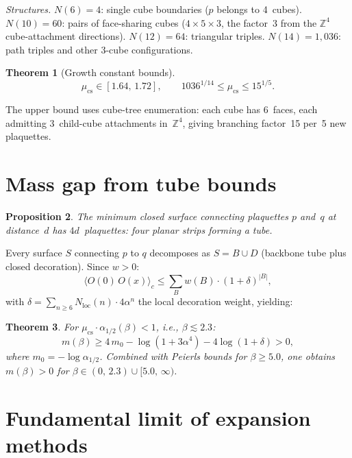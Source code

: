 \documentclass[12pt,a4paper]{article}
\newtheorem{theorem}{Theorem}[section]
\newtheorem{proposition}[theorem]{Proposition}
\newcommand{\Z}{\mathbb{Z}}
\begin{document}
\emph{Structures.} $N(6)=4$: single cube boundaries ($p$ belongs to 4~cubes). $N(10)=60$: pairs of face-sharing cubes ($4\times 5\times 3$, the factor~3 from the $\Z^4$ cube-attachment directions). $N(12)=64$: triangular triples. $N(14)=1{,}036$: path triples and other 3-cube configurations.

\begin{theorem}[Growth constant bounds]\label{thm:growth}
\begin{equation}
\mu_{\mathrm{cs}}\in[1.64,\,1.72], \qquad 1036^{1/14}\le \mu_{\mathrm{cs}}\le 15^{1/5}.
\end{equation}
\end{theorem}

The upper bound uses cube-tree enumeration: each cube has 6~faces, each admitting 3~child-cube attachments in~$\Z^4$, giving branching factor~15 per~5 new plaquettes.

\section{Mass gap from tube bounds}\label{sec:tube}

\begin{proposition}\label{prop:tube}
The minimum closed surface connecting plaquettes $p$ and~$q$ at distance~$d$ has $4d$~plaquettes: four planar strips forming a tube.
\end{proposition}

Every surface $S$ connecting $p$ to $q$ decomposes as $S=B\cup D$ (backbone tube plus closed decoration). Since $w>0$:
\begin{equation}
\langle O(0)\,O(x)\rangle_c \le \sum_B w(B)\cdot(1{+}\delta)^{|B|},
\end{equation}
with $\delta=\sum_{n\ge 6}N_{\mathrm{loc}}(n)\cdot 4\alpha^n$ the local decoration weight, yielding:

\begin{theorem}\label{thm:mass}
For $\mu_{\mathrm{cs}}\cdot\alpha_{1/2}(\beta)<1$, i.e., $\beta\lesssim 2.3$:
\begin{equation}
m(\beta) \ge 4\,m_0 - \log(1{+}3\alpha^4) - 4\log(1{+}\delta) > 0,
\end{equation}
where $m_0=-\log\alpha_{1/2}$. Combined with Peierls bounds for $\beta\ge 5.0$, one obtains $m(\beta)>0$ for $\beta\in(0,\,2.3)\cup[5.0,\,\infty)$.
\end{theorem}

\section{Fundamental limit of expansion methods}\label{sec:limit}
\end{document}
